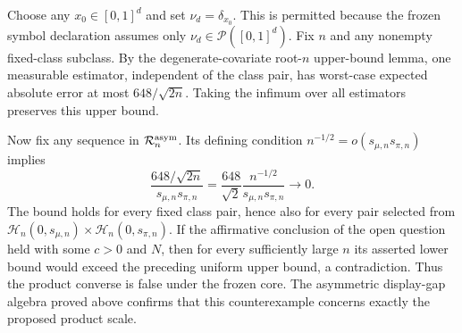 Choose any \(x_0\in[0,1]^d\) and set \(\nu_d=\delta_{x_0}\). This is permitted because the frozen symbol declaration assumes only \(\nu_d\in\mathcal P([0,1]^d)\). Fix \(n\) and any nonempty fixed-class subclass. By the degenerate-covariate root-\(n\) upper-bound lemma, one measurable estimator, independent of the class pair, has worst-case expected absolute error at most \(648/\sqrt{2n}\). Taking the infimum over all estimators preserves this upper bound.

Now fix any sequence in \(\mathcal R_n^{\rm asym}\). Its defining condition \(n^{-1/2}=o(s_{\mu,n}s_{\pi,n})\) implies
\[
\frac{648/\sqrt{2n}}{s_{\mu,n}s_{\pi,n}}
=\frac{648}{\sqrt2}\frac{n^{-1/2}}{s_{\mu,n}s_{\pi,n}}
\longrightarrow0.
\]
The bound holds for every fixed class pair, hence also for every pair selected from \(\mathcal H_n(0,s_{\mu,n})\times\mathcal H_n(0,s_{\pi,n})\). If the affirmative conclusion of the open question held with some \(c>0\) and \(N\), then for every sufficiently large \(n\) its asserted lower bound would exceed the preceding uniform upper bound, a contradiction. Thus the product converse is false under the frozen core. The asymmetric display-gap algebra proved above confirms that this counterexample concerns exactly the proposed product scale.